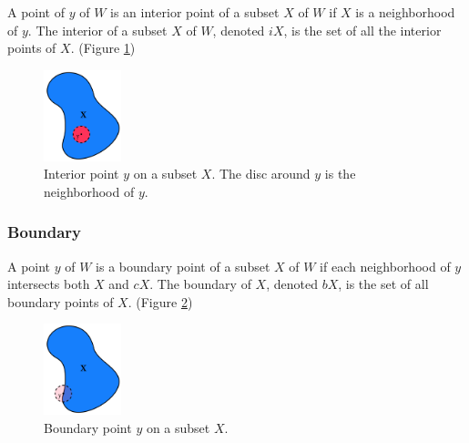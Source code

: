 \documentclass[a4paper,11pt,oneside]{article}
\begin{document}
\begin{definition}
	A point of $y$ of $W$ is an interior point of a subset $X$ of $W$ if $X$ is a neighborhood of $y$. The interior of a subset $X$ of $W$, denoted $iX$, is the set of all the interior points of $X$. \cite{Requicha1978MathematicalFO} (Figure \ref{sec3.2:interior-neighborhood})
\end{definition}
    

\begin{figure}[ht]
	\begin{center}
		\includegraphics[width=0.2\textwidth]{section3/3.2/interior.png}
	\end{center}
	\caption{Interior point $y$ on a subset $X$. The disc around $y$ is the neighborhood of $y$.}
	\label{sec3.2:interior-neighborhood}
\end{figure}

\subsubsection{Boundary}
    
\begin{definition}
	A point $y$ of $W$ is a boundary point of a subset $X$ of $W$ if each neighborhood of $y$ intersects both $X$ and $cX$. The boundary of $X$, denoted $bX$, is the set of all boundary points of $X$. \cite{Requicha1978MathematicalFO} (Figure \ref{sec3.2:boundary})
\end{definition}
    
\begin{figure}[ht]
	\begin{center}
		\includegraphics[width=0.2\textwidth]{section3/3.2/boundary.png}
	\end{center}
	\caption{Boundary point $y$ on a subset $X$.}
	\label{sec3.2:boundary}
\end{figure}
    
\end{document}
